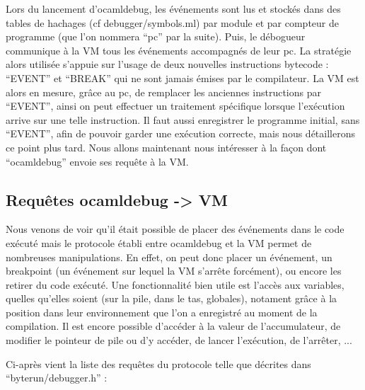 \documentclass[11pt,a4paper]{report}
\begin{document}
Lors du lancement d'ocamldebug, les événements sont lus et stockés dans des tables de hachages (cf debugger/symbols.ml) par module et par compteur de programme (que l'on nommera ``pc'' par la suite). Puis, le débogueur communique à la VM tous les événements accompagnés de leur pc. La stratégie alors utilisée s'appuie sur l'usage de deux nouvelles instructions bytecode : ``EVENT'' et ``BREAK''
qui ne sont jamais émises par le compilateur. La VM est alors en mesure, grâce au pc, de remplacer les anciennes instructions par ``EVENT'', ainsi on peut effectuer un traitement spécifique lorsque l'exécution arrive sur une telle instruction. Il faut aussi enregistrer le programme initial, sans ``EVENT'', afin de pouvoir garder une exécution correcte, mais nous détaillerons ce point plus tard. Nous allons maintenant nous intéresser à la façon dont ``ocamldebug'' envoie ses requête à la VM.

\medskip

\subsection{Requêtes ocamldebug -> VM}

Nous venons de voir qu'il était possible de placer des événements dans le code exécuté mais le protocole établi entre ocamldebug et la VM permet de nombreuses manipulations. En effet, on peut donc placer un événement, un breakpoint (un événement sur lequel la VM s'arrête forcément), ou encore les retirer du code exécuté. Une fonctionnalité bien utile est l'accès aux variables, quelles qu'elles soient (sur la pile, dans le tas, globales), notament grâce à la position dans leur environnement que l'on a enregistré au moment de la compilation. Il est encore possible d'accéder à la valeur de l'accumulateur, de modifier le pointeur de pile ou d'y accéder, de lancer l'exécution, de l'arrêter, ...

\smallskip

Ci-après vient la liste des requêtes du protocole telle que décrites dans ``byterun/debugger.h'' :

\medskip
\end{document}
